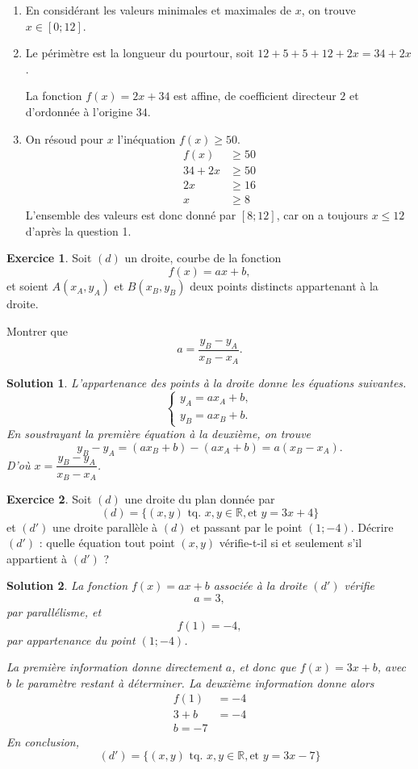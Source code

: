 \documentclass[12pt]{paper}
\theoremstyle{plain}
\newtheorem*{sol}{Solution}
\theoremstyle{definition}
\newtheorem{ex}{Exercice}
\newcommand{\R}{\mathbb{R}}
\newcommand{\exe}[2]{
		\begin{ex} #1  \end{ex}
		\begin{sol} #2 \end{sol}
	}
\newcommand{\exe}[2]{
		\begin{ex} #1  \end{ex}
	}
\begin{document}
{
	
	\begin{enumerate}
		\item En considérant les valeurs minimales et maximales de $x$, on trouve $x \in [0;12]$.
		\item Le périmètre est la longueur du pourtour, soit $12 + 5 + 5 + 12 + 2x = 34 + 2x$.
		
		La fonction $f(x) = 2x+34$ est affine, de coefficient directeur $2$ et d'ordonnée à l'origine $34$.
		\item On résoud pour $x$ l'inéquation $f(x) \geq 50$.
			\begin{align*}
				f(x) &\geq 50 \\
				34+2x &\geq 50 \\
				2x &\geq 16 \\
				x &\geq 8
			\end{align*}
		L'ensemble des valeurs est donc donné par $[8;12]$, car on a toujours $x \leq 12$ d'après la question 1.
	\end{enumerate}

}

\exe{
	Soit $(d)$ un droite, courbe de la fonction
		\[ f(x) = ax + b, \]
	et soient $A(x_A,y_A)$ et $B(x_B,y_B)$ deux points distincts appartenant à la droite.
	
	Montrer que 
		\[ a  = \dfrac{y_B - y_A}{x_B-x_A}. \]
}{

	L'appartenance des points à la droite donne les équations suivantes.
		\[ \begin{cases*}
			y_A = ax_A + b, \\
			y_B = ax_B + b.
		\end{cases*} \]
	En soustrayant la première équation à la deuxième, on trouve
		\[ y_B -y_A = (ax_B + b)-(ax_A + b) = a(x_B - x_A). \]
	D'où $x = \dfrac{y_B - y_A}{x_B-x_A}$.

}

\exe{
	Soit $(d)$ une droite du plan donnée par
		\[ (d) = \{ (x,y) \text{ tq. } x,y\in\R, \text{et }  y=3x+4 \} \] 
	et $(d')$ une droite parallèle à $(d)$ et passant par le point $(1;-4)$.
	Décrire $(d')$ : quelle équation tout point $(x,y)$ vérifie-t-il si et seulement s'il appartient à $(d')$ ?
}{
	La fonction $f(x) = ax+b$ associée à la droite $(d')$ vérifie 
		\[ a =3, \]
	par parallélisme, et
		\[ f(1) = -4, \]
	par appartenance du point $(1;-4)$.
	
	La première information donne directement $a$, et donc que $f(x) = 3x + b$, avec $b$ le paramètre restant à déterminer.
	La deuxième information donne alors
		\begin{align*}
			f(1) &= -4 \\
			3 + b &= -4 \\
			b = -7
		\end{align*}
	En conclusion, 
		\[ (d') = \{ (x,y) \text{ tq. } x,y\in\R, \text{et }  y=3x-7 \} \] 
}
\end{document}
